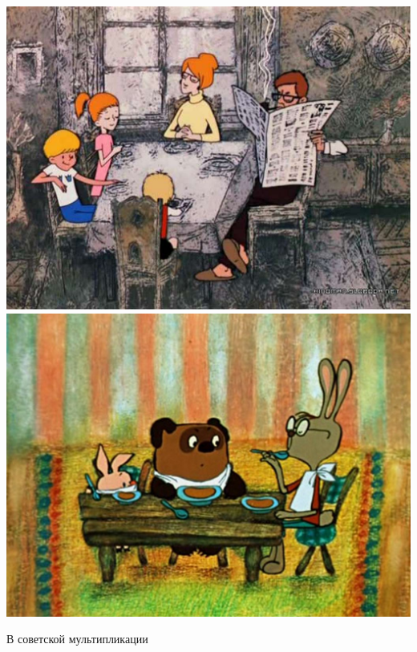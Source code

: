 \documentclass[10pt]{beamer}
\begin{document}
    {
    	{
    		\centering
    		\includegraphics[width=\textwidth]{3.jpg}
    	}
    	{
    		\centering
    		\includegraphics[width=\textwidth]{1.jpg}
    	} 	
    	
    	\centering 
    	
    	В советской мультипликации
    }
    
\end{document}

